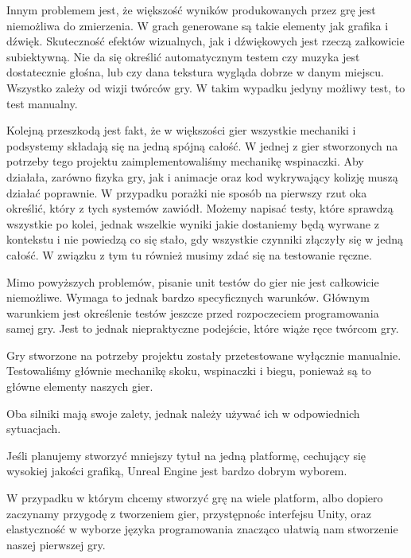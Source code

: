 \documentclass[12pt]{xmgr}
\begin{document}
Innym problemem jest, że większość wyników produkowanych przez grę jest niemożliwa do zmierzenia.
W grach generowane są takie elementy jak grafika i dźwięk.  Skuteczność efektów wizualnych, jak i dźwiękowych jest rzeczą załkowicie subiektywną. Nie da się określić automatycznym testem czy muzyka jest dostatecznie głośna, lub czy dana tekstura wygląda dobrze w danym miejscu. Wszystko zależy od wizji twórców gry. W takim wypadku jedyny możliwy test, to test manualny.

Kolejną przeszkodą jest fakt, że w większości gier wszystkie mechaniki i podsystemy składają się na jedną spójną całość. W jednej z gier stworzonych na potrzeby tego projektu zaimplementowaliśmy mechanikę wspinaczki. Aby działała, zarówno fizyka gry, jak i animacje oraz kod wykrywający kolizję muszą działać poprawnie. W przypadku porażki nie sposób na pierwszy rzut oka określić, który z tych systemów zawiódł. Możemy napisać testy, które sprawdzą wszystkie po kolei, jednak wszelkie wyniki jakie dostaniemy będą wyrwane z kontekstu i nie powiedzą co się stało, gdy wszystkie czynniki złączyły się w jedną całość. W związku z tym tu również musimy zdać się na testowanie ręczne.

Mimo powyższych problemów, pisanie unit testów do gier nie jest całkowicie niemożliwe. Wymaga to jednak bardzo specyficznych warunków. Głównym warunkiem jest określenie testów jeszcze przed rozpoczeciem programowania samej gry. Jest to jednak niepraktyczne podejście, które wiąże ręce twórcom gry.

Gry stworzone na potrzeby projektu zostały przetestowane wyłącznie manualnie. Testowaliśmy głównie mechanikę skoku, wspinaczki i biegu, ponieważ są to główne elementy naszych gier.


\summary
Oba silniki mają swoje zalety, jednak należy używać ich w odpowiednich sytuacjach.

Jeśli planujemy stworzyć mniejszy tytuł na jedną platformę, cechujący się wysokiej jakości grafiką, Unreal Engine jest bardzo dobrym wyborem.

W przypadku w którym chcemy stworzyć grę na wiele platform, albo dopiero zaczynamy przygodę z tworzeniem gier, przystępnośc interfejsu Unity, oraz elastyczność w wyborze języka programowania znacząco ułatwią nam stworzenie naszej pierwszej gry.






\nocite{*}



\listoftables

\listoffigures

\oswiadczenie
\end{document}
